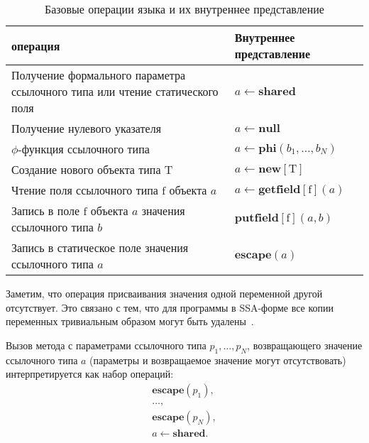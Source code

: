 \documentclass[14pt,titlepage,draft]{extarticle}
\newcommand{\java}{\eng{Java}\xspace}
\let\mathphi\phi
\renewcommand{\phi}{\ensuremath{\mathphi}}
\newcommand{\type}[1]{\mathrm{#1}}
\newcommand{\field}[1]{\mathrm{#1}}
\newcommand{\op}[1]{\mathbf{#1}}
\begin{document}
    \begin{table}[htb]
      \centering

      \begin{tabular}{|p{}|p{}|}\hline
        \textbf{\java операция} &
          \textbf{Внутреннее представление}\\ \hline

        Получение формального параметра ссылочного типа или
        чтение статического поля
        & $a \gets \op{shared}$
        \\ \hline

        Получение нулевого указателя
        & $a \gets \op{null}$
        \\ \hline

        \phi-функция ссылочного типа
        & $a \gets \op{phi}(b_1, \ldots, b_N)$
        \\ \hline

        Создание нового объекта типа $\type{T}$
        & $a \gets \op{new}[\type{T}]$
        \\ \hline

        Чтение поля ссылочного типа $\field{f}$ объекта $a$
        & $a \gets \op{getfield}[\field{f}](a)$
        \\ \hline

        Запись в поле $\field{f}$ объекта $a$ значения ссылочного типа $b$
        & $\op{putfield}[\field{f}](a, b)$
        \\ \hline

        Запись в статическое поле значения ссылочного типа $a$
        & $\op{escape}(a)$
        \\ \hline

      \end{tabular}
      \caption{Базовые операции языка \java и их внутреннее представление}
      \label{tabular:basic_operations}
    \end{table}

    Заметим, что операция присваивания значения одной переменной другой
    отсутствует.
    Это связано с тем, что для программы в SSA-форме все копии переменных
    тривиальным образом могут быть удалены~\cite{ssa}.

    Вызов метода с параметрами ссылочного типа $p_1, \ldots, p_N$, возвращающего
    значение ссылочного типа $a$ (параметры и возвращаемое значение могут
    отсутствовать) интерпретируется как набор операций:
    \begin{gather*}
      \op{escape}(p_1), \\
      \ldots, \\
      \op{escape}(p_N), \\
      a \gets \op{shared}.
    \end{gather*}
\end{document}
